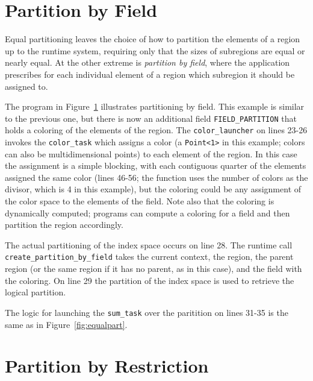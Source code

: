 \section{Partition by Field}
\label{sec:pbf}

Equal partitioning leaves the choice of how to partition the elements of a region
up to the runtime system, requiring only that the sizes of subregions are
equal or nearly equal.  At the other extreme is {\em partition by field}, where
the application prescribes for each individual element of a region which subregion it should be assigned to.

The program in Figure~\ref{fig:pbf} illustrates partitioning by field.  This example is similar to the previous one,
but there is now an additional field {\tt FIELD\_PARTITION} that holds a coloring of the elements of the region.
The {\tt color\_launcher} on lines 23-26 invokes the {\tt color\_task} which assigns a color (a {\tt Point<1>} in this example; colors can also be multidimensional points) to each
element of the region.  In this case the assignment is a simple blocking, with each contiguous quarter of the elements assigned the same
color (lines 46-56; the function uses the number of colors as the divisor, which is 4 in this example), but the coloring could be any assignment of the color space to the elements of the field.  Note also that the
coloring is dynamically computed; programs can compute a coloring for a field and then partition the region accordingly.

The actual partitioning of the index space occurs on line 28.  The runtime call {\tt create\_partition\_by\_field} takes the current
context, the region, the parent region (or the same region if it has no parent, as in this case), and the field with the coloring.
On line 29 the partition of the index space is used to retrieve the logical partition.

The logic for launching the {\tt sum\_task} over the paritition on lines 31-35 is the same as in Figure~\ref{fig:equalpart}.

\begin{figure}
  {\small
   
  }
  \caption{}
  \label{fig:pbf}
\end{figure}

\section{Partition by Restriction}
\label{sec:pbr}

